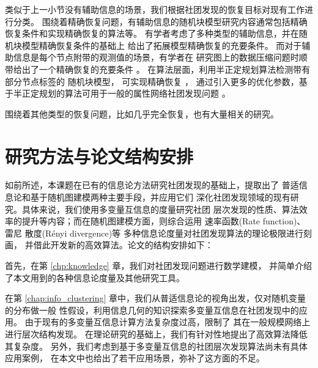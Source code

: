 类似于上一小节没有辅助信息的场景，我们根据社团发现的恢复目标对现有工作进行分类。
围绕着精确恢复问题，有辅助信息的随机块模型研究内容通常包括精确恢复条件和实现精确恢复的算法等。
有学者考虑了多种类型的辅助信息，并在随机块模型精确恢复条件的基础上
给出了拓展模型精确恢复的充要条件\cite{saad2018community, esmaeili2019community}。
而对于辅助信息是每个节点附带的观测值的场景，有学者在
研究图上的数据压缩问题时顺带给出了一个精确恢复的充要条件 \cite{abbe17sideinfo}。
在算法层面，利用半正定规划算法检测带有部分节点标签的 随机块模型，
可实现精确恢复 \cite{esmaeili2019exact}，
通过引入更多的优化参数，基于半正定规划的算法可用于一般的属性网络社团发现问题
\cite{tang2023semidefinite}。


围绕着其他类型的恢复问题，比如几乎完全恢复，也有大量相关的研究\cite{kanade2016global, deshpande2018contextual}。

\section{研究方法与论文结构安排}
如前所述，本课题在已有的信息论方法研究社团发现的基础上，提取出了
普适信息论和基于随机图建模两种主要手段，并应用它们
深化社团发现领域的现有研究。具体来说，我们使用多变量互信息的度量研究社团
层次发现的性质、算法效率的提升等内容；而在随机图建模方面，则综合运用
速率函数(Rate function)、雷尼
散度(Rényi divergence)等
多种信息论度量对社团发现算法的理论极限进行刻画，
并借此开发新的高效算法。论文的结构安排如下：

首先，在第 \ref{chp:knowledge} 章，我们对社团发现问题进行数学建模，
并简单介绍了本文用到的各种信息论度量及其他研究工具。

在第 \ref{chap:info_clustering} 章中，我们从普适信息论的视角出发，仅对随机变量的分布做一般
性假设，利用信息几何的知识探索多变量互信息在社团发现中的应用。
由于现有的多变量互信息计算方法复杂度过高，限制了
其在一般规模网络上进行层次结构发现。
在理论研究的基础上，我们有针对性地提出了高效算法降低其复杂度。
另外，我们考虑到基于多变量互信息的社团层次发现算法尚未有具体应用案例，
在本文中也给出了若干应用场景，弥补了这方面的不足。


